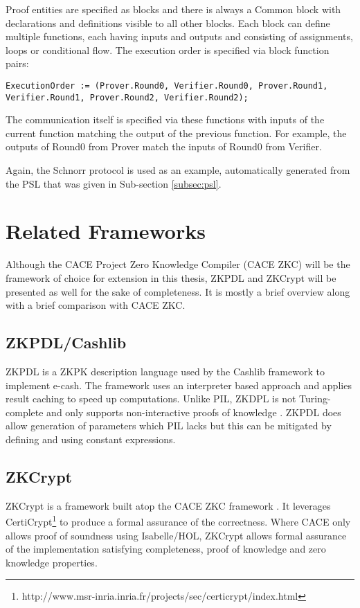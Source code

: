 Proof entities are specified as blocks and there is always a Common
block with declarations and definitions visible to all other
blocks. Each block can define multiple functions, each having inputs
and outputs and consisting of assignments, loops or conditional
flow. The execution order is specified via block function pairs:
\begin{lstlisting}[language=PIL]
ExecutionOrder := (Prover.Round0, Verifier.Round0, Prover.Round1, Verifier.Round1, Prover.Round2, Verifier.Round2);
\end{lstlisting}
The communication itself is specified via these functions with inputs
of the current function matching the output of the previous
function. For example, the outputs of Round0 from Prover match the
inputs of Round0 from Verifier.

Again, the Schnorr protocol is used as an example, automatically
generated from the PSL that was given in Sub-section \ref{subsec:psl}.


\section{Related Frameworks}

Although the CACE Project Zero Knowledge Compiler (CACE ZKC) will be
the framework of choice for extension in this thesis, ZKPDL and
ZKCrypt will be presented as well for the sake of completeness. It is
mostly a brief overview along with a brief comparison with CACE ZKC.

\subsection{ZKPDL/Cashlib}

ZKPDL is a ZKPK description language used by the Cashlib framework to
implement e-cash. The framework uses an interpreter based approach and
applies result caching to speed up computations. Unlike PIL, ZKDPL is
not Turing-complete and only supports non-interactive proofs of
knowledge \cite{zkpdl}. ZKPDL does allow generation of parameters
which PIL lacks \cite{yaczk} but this can be mitigated by defining and
using constant expressions.

\subsection{ZKCrypt}
\label{subsec:zkcrypt}

ZKCrypt is a framework built atop the CACE ZKC framework
\cite{zkcrypt}. It leverages
CertiCrypt\footnote{http://www.msr-inria.inria.fr/projects/sec/certicrypt/index.html}
to produce a formal assurance of the correctness. Where CACE only
allows proof of soundness using Isabelle/HOL, ZKCrypt allows formal
assurance of the implementation satisfying completeness, proof of
knowledge and zero knowledge properties.

